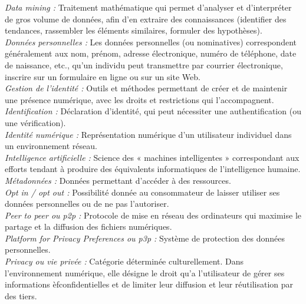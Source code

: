 \documentclass[a4paper,12pt]{article}
\begin{document}
\emph{Data mining :} Traitement mathématique qui permet d’analyser et d’interpréter de gros volume de données, afin d’en extraire des connaissances (identifier des tendances, rassembler les éléments similaires, formuler des hypothèses). \\


\emph{Données personnelles :} Les données personnelles (ou nominatives) correspondent généralement aux nom, prénom, adresse électronique, numéro de téléphone, date de naissance, etc., qu’un individu peut transmettre par courrier électronique, inscrire sur un formulaire en ligne ou sur un site Web.\\


\emph{Gestion de l’identité :} Outils et méthodes permettant de créer et de maintenir une présence numérique, avec les droits et restrictions qui l’accompagnent. \\


\emph{Identification :} Déclaration d’identité, qui peut nécessiter une authentification (ou une vérification). \\


\emph{Identité numérique :} Représentation numérique d’un utilisateur individuel dans un environnement réseau. \\


\emph{Intelligence artificielle :} Science des « machines intelligentes » correspondant aux efforts tendant à produire des équivalents informatiques de l’intelligence humaine. \\


\emph{Métadonnées :} Données permettant d’accéder à des ressources. \\


\emph{Opt in / opt out :} Possibilité donnée au consommateur de laisser utiliser ses données personnelles ou de ne pas l’autoriser. \\


\emph{Peer to peer ou p2p :} Protocole de mise en réseau des ordinateurs qui maximise le partage et la diffusion des fichiers numériques. \\


\emph{Platform for Privacy Preferences ou p3p :} Système de protection des données personnelles. \\


\emph{Privacy ou vie privée :} Catégorie déterminée culturellement. Dans l’environnement numérique, elle désigne le droit qu’a l’utilisateur de gérer ses informations èfconfidentielles et de limiter leur diffusion et leur réutilisation par des tiers. \\
\end{document}
